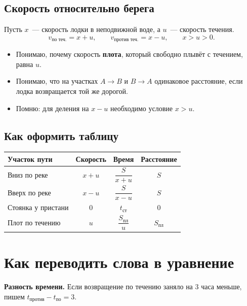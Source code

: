 \documentclass[a4paper,12pt]{article}
\newcommand{\important}[1]{\textcolor{darkaccent}{\textbf{#1}}}
\newcommand{\checkline}[1]{\item[$\square$] #1}
\begin{document}
\subsection{Скорость относительно берега}
Пусть $x$~--- скорость лодки в неподвижной воде, а $u$~--- скорость течения.
\[
\boxed{v_{\text{по теч.}}=x+u}, \qquad
\boxed{v_{\text{против теч.}}=x-u},\qquad x>u>0.
\]
\begin{center}
\end{center}
\begin{itemize}[label={$\square$}]
\checkline{Понимаю, почему скорость \important{плота}, который свободно плывёт с течением, равна $u$.}
\checkline{Понимаю, что на участках $A\to B$ и $B\to A$ одинаковое расстояние, если лодка возвращается той же дорогой.}
\checkline{Помню: для деления на $x-u$ необходимо условие $x>u$.}
\end{itemize}

\subsection{Как оформить таблицу}
\renewcommand{\arraystretch}{1.22}
\begin{center}
\begin{tabularx}{\linewidth}{@{}Xccc@{}}
\toprule
Участок пути & Скорость & Время & Расстояние \\
\midrule
Вниз по реке & $x+u$ & $\dfrac{S}{x+u}$ & $S$ \\
Вверх по реке & $x-u$ & $\dfrac{S}{x-u}$ & $S$ \\
Стоянка у пристани & $0$ & $t_{\text{ст}}$ & $0$ \\
Плот по течению & $u$ & $\dfrac{S_{\text{пл}}}{u}$ & $S_{\text{пл}}$ \\
\bottomrule
\end{tabularx}
\end{center}

\section{Как переводить слова в уравнение}
\important{Разность времени.} Если возвращение по течению заняло на $3$ часа меньше, пишем $t_{\text{против}}-t_{\text{по}}=3$.
\end{document}
